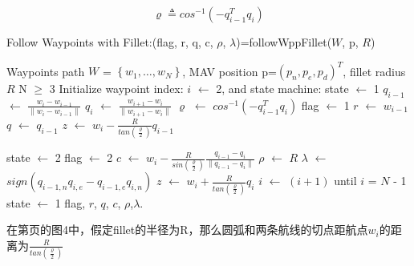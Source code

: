 \documentclass[UTF8,a4paper,10pt,nocolorlinks]{ctexart}
\begin{document}
    \begin{equation}
        \varrho \triangleq cos^{-1}(-q_{i-1}^{T}q_{i})
    \end{equation}
    
    \begin{algorithm}[h]
            \caption{Follow Waypoints with Fillet:(flag, r, q, c, $\rho$, $\lambda$)=followWppFillet($\textit{W}$, p, $R$)}
            \label{algo6:ref}
            \begin{algorithmic}[1]
                \ENSURE Waypoints path $\textit{W}$ = $\left\{ w_{1}, \dots, w_{N} \right\}$, MAV position p=$(p_{n}, p_{e}, p_{d})^{T}$, fillet radius $R$
                \REQUIRE N $\geq$ 3
                    \STATE Initialize waypoint index: $i$ $\gets$ 2, and state machine: state $\gets$ 1
                \ENDIF
                \STATE $q_{i-1}$ $\gets$ $\frac{w_{i}-w_{i-1}}{\lVert w_{i}-w_{i-1} \rVert}$
                \STATE $q_{i}$ $\gets$ $\frac{w_{i+1}-w_{i}}{\lVert w_{i+1}-w_{i} \rVert}$
                \STATE $\varrho$ $\gets$ $cos^{-1}(-q_{i-1}^{T}q_{i})$
                    \STATE flag $\gets$ 1
                    \STATE $r$ $\gets$ $w_{i-1}$
                    \STATE $q$ $\gets$ $q_{i-1}$
                    \STATE $z$ $\gets$ $w_{i} - \frac{R}{tan(\frac{\varrho}{2})}q_{i-1}$

                        \STATE state $\gets$ 2
                    \ENDIF
                    \STATE flag $\gets$ 2
                    \STATE $c$ $\gets$ $w_{i} - \frac{R}{sin(\frac{\varrho}{2})}\frac{q_{i-1}-q_{i}}{\lVert q_{i-1}-q_{i} \rVert}$
                    \STATE $\rho$ $\gets$ $R$
                    \STATE $\lambda$ $\gets$ $sign(q_{i-1,n}q_{i,e}-q_{i-1,e}q_{i,n})$
                    \STATE $z$ $\gets$ $w_{i} + \frac{R}{tan(\frac{\varrho}{2})}q_{i}$
                        \STATE $i$ $\gets$ $\left(i+1\right)$ until $i$ = $N$ - 1
                        \STATE state $\gets$ 1
                    \ENDIF
                \ENDIF
                \RETURN flag, $r$, $q$, $c$, $\rho$,$\lambda$.  %
            \end{algorithmic}
        \end{algorithm}
在第\pageref{figure:alg6}页的图4中，假定fillet的半径为R，那么圆弧和两条航线的切点距航点$w_{i}$的距离为$\frac{R}{tan(\frac{\varrho}{2})}$
\end{document}
